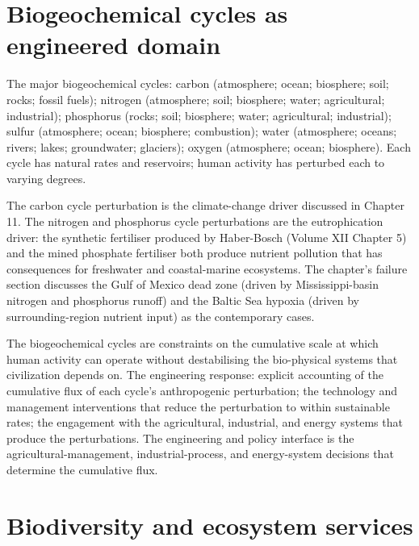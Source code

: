 \section{Biogeochemical cycles as engineered domain}

The major biogeochemical cycles: carbon (atmosphere; ocean; biosphere; soil; rocks; fossil fuels); nitrogen (atmosphere; soil; biosphere; water; agricultural; industrial); phosphorus (rocks; soil; biosphere; water; agricultural; industrial); sulfur (atmosphere; ocean; biosphere; combustion); water (atmosphere; oceans; rivers; lakes; groundwater; glaciers); oxygen (atmosphere; ocean; biosphere). Each cycle has natural rates and reservoirs; human activity has perturbed each to varying degrees.

The carbon cycle perturbation is the climate-change driver discussed in Chapter 11. The nitrogen and phosphorus cycle perturbations are the eutrophication driver: the synthetic fertiliser produced by Haber-Bosch (Volume XII Chapter 5) and the mined phosphate fertiliser both produce nutrient pollution that has consequences for freshwater and coastal-marine ecosystems. The chapter's failure section discusses the Gulf of Mexico dead zone (driven by Mississippi-basin nitrogen and phosphorus runoff) and the Baltic Sea hypoxia (driven by surrounding-region nutrient input) as the contemporary cases.

\begin{principle}
The biogeochemical cycles are constraints on the cumulative scale at which human activity can operate without destabilising the bio-physical systems that civilization depends on. The engineering response: explicit accounting of the cumulative flux of each cycle's anthropogenic perturbation; the technology and management interventions that reduce the perturbation to within sustainable rates; the engagement with the agricultural, industrial, and energy systems that produce the perturbations. The engineering and policy interface is the agricultural-management, industrial-process, and energy-system decisions that determine the cumulative flux.
\end{principle}

\section{Biodiversity and ecosystem services}

